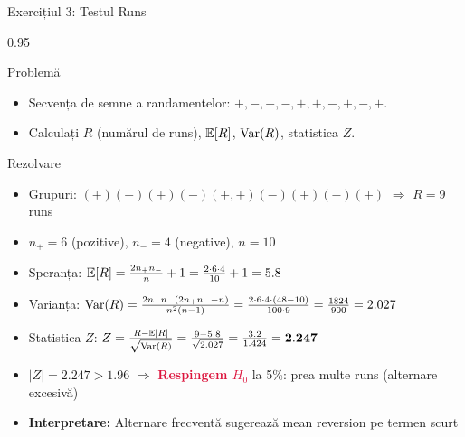 \documentclass[9pt, aspectratio=169, t]{beamer}
\begin{document}
\begin{frame}{Exercițiul 3: Testul Runs}
    \begin{cminipage}{0.95\textwidth}
\begin{block}{Problemă}
\begin{itemize}\setlength{\itemsep}{0pt}
    \item Secvența de semne a randamentelor: $+, -, +, -, +, +, -, +, -, +$.
    \item Calculați $R$ (numărul de runs), $\mathbb{E}[R]$, $\text{Var}(R)$, statistica $Z$.
\end{itemize}
\end{block}

\begin{exampleblock}{Rezolvare}
\small
\begin{itemize}\setlength{\itemsep}{0pt}
    \item Grupuri: $(+)(-)( +)(-)( +,+)(-)(+)(-)(+)$ $\Rightarrow$ $R = 9$ runs
    \item $n_+ = 6$ (pozitive), $n_- = 4$ (negative), $n = 10$
    \item Speranța: $\mathbb{E}[R] = \frac{2 n_+ n_-}{n} + 1 = \frac{2 \cdot 6 \cdot 4}{10} + 1 = 5.8$
    \item Varianța:
$\text{Var}(R) = \frac{2n_+n_-(2n_+n_- - n)}{n^2(n-1)} = \frac{2 \cdot 6 \cdot 4 \cdot (48-10)}{100 \cdot 9} = \frac{1824}{900} = 2.027$
    \item Statistica $Z$:
$Z = \frac{R - \mathbb{E}[R]}{\sqrt{\text{Var}(R)}} = \frac{9 - 5.8}{\sqrt{2.027}} = \frac{3.2}{1.424} = \mathbf{2.247}$
    \item $|Z| = 2.247 > 1.96$ $\Rightarrow$ \textcolor{Crimson}{\textbf{Respingem $H_0$}} la 5\%: prea multe runs (alternare excesivă)
    \item \textbf{Interpretare:} Alternare frecventă sugerează mean reversion pe termen scurt
\end{itemize}
\end{exampleblock}
    \end{cminipage}
\end{frame}
\end{document}
